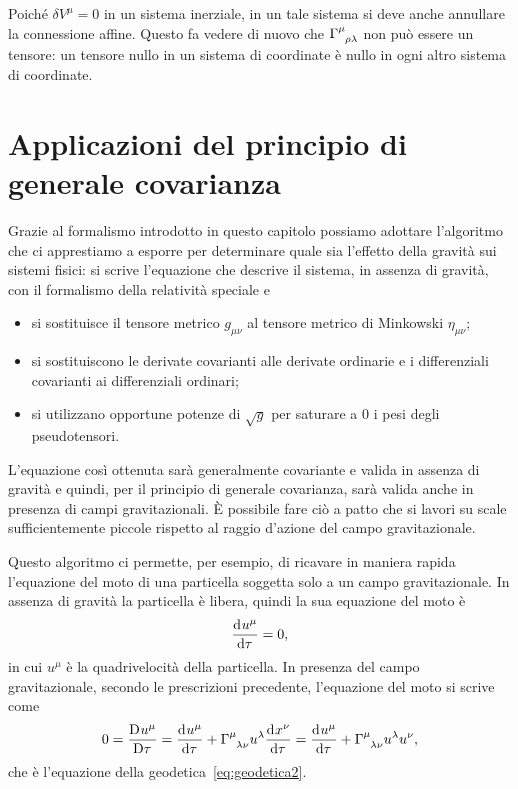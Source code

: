 Poiché $\delta V^{\mu} = 0$ in un sistema inerziale, in un tale sistema si deve
anche annullare la connessione affine.  Questo fa
vedere di nuovo che $\tensor{\Gamma}{^{\mu}_{\rho\lambda}}$ non può essere un
tensore: un tensore nullo in un sistema di coordinate è nullo in ogni altro
sistema di coordinate.

\section{Applicazioni del principio di generale covarianza}
\label{sec:applicazioni-generale-covarianza}

Grazie al formalismo introdotto in questo capitolo possiamo adottare l'algoritmo
che ci apprestiamo a esporre per determinare quale sia l'effetto della gravità
sui sistemi fisici: si scrive l'equazione che descrive il sistema, in assenza di
gravità, con il formalismo della relatività speciale e
\begin{itemize}
\item si sostituisce il tensore metrico $g_{\mu\nu}$ al tensore metrico di
  Minkowski $\eta_{\mu\nu}$;
\item si sostituiscono le derivate covarianti alle derivate ordinarie e i
  differenziali covarianti ai differenziali ordinari;
\item si utilizzano opportune potenze di $\sqrt{g}$ per saturare a $0$ i pesi
  degli pseudotensori.
\end{itemize}
L'equazione così ottenuta sarà generalmente covariante e valida in assenza di
gravità e quindi, per il principio di
generale covarianza, sarà valida anche in presenza di campi gravitazionali.  È
possibile fare ciò a patto che si lavori su scale sufficientemente piccole
rispetto al raggio d'azione del campo gravitazionale.

Questo algoritmo ci permette, per esempio, di ricavare in maniera rapida
l'equazione del moto di una particella soggetta solo a un campo gravitazionale.
In assenza di gravità la particella è libera, quindi la sua equazione del moto è
\begin{equation}
  \frac{{\mathop{}\!\mathrm{d}^{}}u^{\mu}}{\mathop{}\!\mathrm{d} {\tau}^{}} = 0,
\end{equation}
in cui $u^{\mu}$ è la quadrivelocità della particella.  In
presenza del campo gravitazionale, secondo le prescrizioni precedente,
l'equazione del moto si scrive come
\begin{equation}
  0 = \covder{u^{\mu}}{\tau} = \toder{u^{\mu}}{\tau} +
  \tensor{\Gamma}{^{\mu}_{\lambda\nu}} u^{\lambda} \toder{x^{\nu}}{\tau} =
  \toder{u^{\mu}}{\tau} + \tensor{\Gamma}{^{\mu}_{\lambda\nu}} u^{\lambda}
  u^{\nu},
\end{equation}
che è l'equazione della geodetica~\eqref{eq:geodetica2}.

